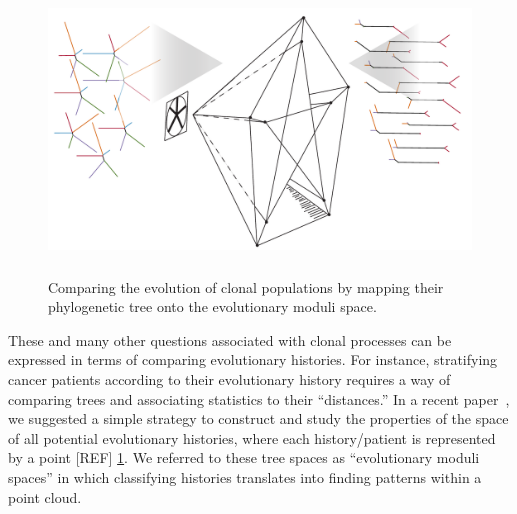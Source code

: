 \documentclass[a4paper,11pt]{article}
\begin{document}
\begin{figure}
    \centering
    \includegraphics[height=3in]{figures/cartoon_2.pdf}
    \caption{Comparing the evolution of clonal populations by mapping their phylogenetic tree onto the evolutionary moduli space.}
    \label{fig:cartoon_2}
\end{figure}

These and many other questions associated with clonal processes can be expressed in terms of comparing  evolutionary histories.
For instance, stratifying cancer patients according to their evolutionary history requires a way of comparing trees and associating statistics to their ``distances.''
In a recent paper~\cite{zairis2014moduli}, we suggested a simple strategy to construct and study the properties of the space of all potential evolutionary histories, where each history/patient is represented by a point  [REF] \ref{fig:cartoon_2}. We referred to these tree spaces as  ``evolutionary moduli spaces'' in which classifying histories translates into finding patterns within a point cloud.
\end{document}
